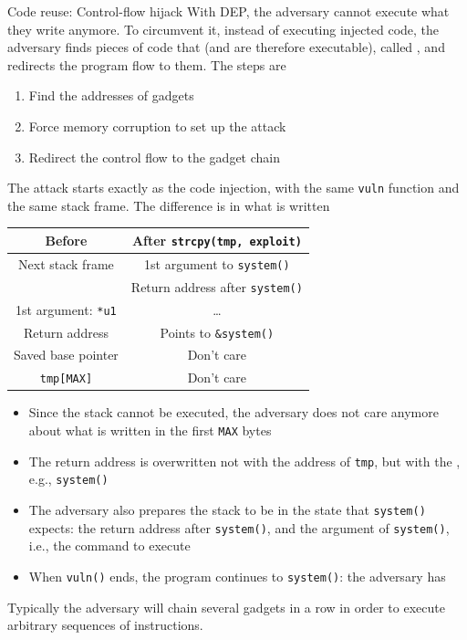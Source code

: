 \begin{parag}{Code reuse: Control-flow hijack}
    With DEP, the adversary cannot execute what they write anymore. To circumvent it, instead of executing injected code, the adversary finds pieces of code that  (and are therefore executable), called , and redirects the program flow to them. The steps are
    \begin{enumerate}
        \item Find the addresses of gadgets
        \item Force memory corruption to set up the attack
        \item Redirect the control flow to the gadget chain
    \end{enumerate}
    The attack starts exactly as the code injection, with the same \texttt{vuln} function and the same stack frame. The difference is in what is written
    \begin{center}
        \begin{tabular}{|c|c|}
            \hline
            \textbf{Before} & \textbf{After \texttt{strcpy(tmp, exploit)}} \\
            \hline
            Next stack frame & 1st argument to \texttt{system()} \\
            \hline
             & Return address after \texttt{system()} \\
            \hline
            1st argument: \texttt{*u1} & \dots \\
            \hline
            Return address & Points to \texttt{\&system()} \\
            \hline
            Saved base pointer & Don't care \\
            \hline
            \texttt{tmp[MAX]} & Don't care \\
            \hline
        \end{tabular}
    \end{center}
    \begin{itemize}
        \item Since the stack cannot be executed, the adversary does not care anymore about what is written in the first \texttt{MAX} bytes
        \item The return address is overwritten not with the address of \texttt{tmp}, but with the , e.g., \texttt{system()}
        \item The adversary also prepares the stack to be in the state that \texttt{system()} expects: the return address after \texttt{system()}, and the argument of \texttt{system()}, i.e., the command to execute
        \item When \texttt{vuln()} ends, the program continues to \texttt{system()}: the adversary has 
    \end{itemize}
    Typically the adversary will chain several gadgets in a row in order to execute arbitrary sequences of instructions.
\end{parag}

